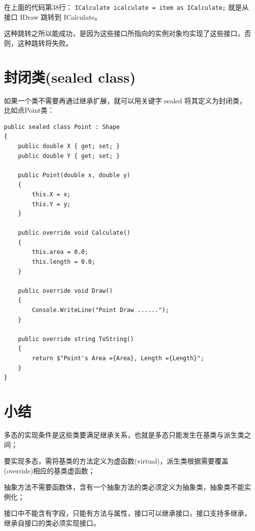 在上面的代码第38行：
\verb|ICalculate icalculate = item as ICalculate;| 就是从接口 IDraw 跳转到 ICalculate。

这种跳转之所以能成功，是因为这些接口所指向的实例对象均实现了这些接口，否则，这种跳转将失败。


\section{封闭类(sealed class)}

如果一个类不需要再通过继承扩展，就可以用关键字 sealed 将其定义为封闭类，比如点Point类：
\begin{lstlisting}
public sealed class Point : Shape
{      
	public double X { get; set; }
	public double Y { get; set; }        
	
	public Point(double x, double y)
	{          
		this.X = x;
		this.Y = y;          
	}
	
	public override void Calculate()
	{
		this.area = 0.0;
		this.length = 0.0;
	}
	
	public override void Draw()
	{
		Console.WriteLine("Point Draw ......");
	}
	
	public override string ToString()
	{
		return $"Point's Area ={Area}, Length ={Length}";
	}
}
\end{lstlisting}

\section{小结}

多态的实现条件是这些类要满足继承关系，也就是多态只能发生在基类与派生类之间；

要实现多态，需将基类的方法定义为虚函数(virtual)，派生类根据需要覆盖(override)相应的基类虚函数；

抽象方法不需要函数体，含有一个抽象方法的类必须定义为抽象类，抽象类不能实例化；

接口中不能含有字段，只能有方法与属性，接口可以继承接口，接口支持多继承，继承自接口的类必须实现接口。
